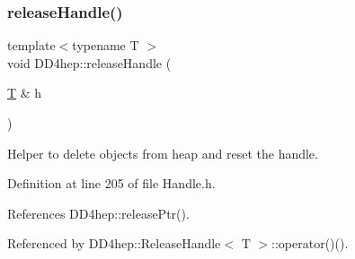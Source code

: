 \hypertarget{group___d_d4_h_e_p___g_e_o_m_e_t_r_y_ga46c1fbec061f190478c98deef29382ef}{}\label{group___d_d4_h_e_p___g_e_o_m_e_t_r_y_ga46c1fbec061f190478c98deef29382ef} 
\subsubsection{\texorpdfstring{release\+Handle()}{releaseHandle()}}
{\footnotesize\ttfamily template$<$typename T $>$ \\
void D\+D4hep\+::release\+Handle (\begin{DoxyParamCaption}\item[{\hyperlink{class_t}{T} \&}]{h }\end{DoxyParamCaption})\hspace{0.3cm}{\ttfamily [inline]}}



Helper to delete objects from heap and reset the handle. 



Definition at line 205 of file Handle.\+h.



References D\+D4hep\+::release\+Ptr().



Referenced by D\+D4hep\+::\+Release\+Handle$<$ T $>$\+::operator()().

